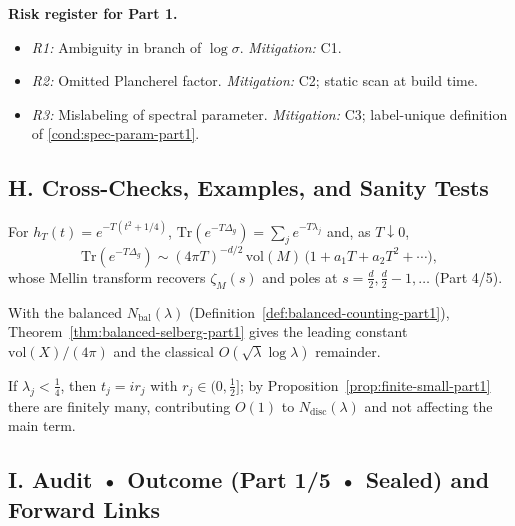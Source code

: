 \medskip

\noindent\textbf{Risk register for Part 1.}
\begin{itemize}
  \item \emph{R1:} Ambiguity in branch of $\log\sigma$. \emph{Mitigation:} C1.
  \item \emph{R2:} Omitted Plancherel factor. \emph{Mitigation:} C2; static scan at build time.
  \item \emph{R3:} Mislabeling of spectral parameter. \emph{Mitigation:} C3; label-unique definition of \eqref{cond:spec-param-part1}.
\end{itemize}


\subsection*{H. Cross-Checks, Examples, and Sanity Tests}
\label{subsec:crosscheck-examples-part1}

\begin{example}
For $h_T(t)=e^{-T(t^2+1/4)}$, $\mathrm{Tr}(e^{-T\Delta_g})=\sum_j e^{-T\lambda_j}$ and, as $T\downarrow0$,
\[
  \mathrm{Tr}(e^{-T\Delta_g})\sim (4\pi T)^{-d/2}\,\mathrm{vol}(M)\,\Big(1+a_1T+a_2T^2+\cdots\Big),
\]
whose Mellin transform recovers $\zeta_M(s)$ and poles at $s=\tfrac d2,\tfrac d2-1,\dots$ (Part 4/5).
\end{example}

\begin{example}
With the balanced $N_{\mathrm{bal}}(\lambda)$ (Definition~\ref{def:balanced-counting-part1}), Theorem~\ref{thm:balanced-selberg-part1} gives the leading constant $\mathrm{vol}(X)/(4\pi)$ and the classical $O(\sqrt{\lambda}\log\lambda)$ remainder.
\end{example}

\begin{example}
If $\lambda_j<\tfrac14$, then $t_j=ir_j$ with $r_j\in(0,\tfrac12]$; by Proposition~\ref{prop:finite-small-part1} there are finitely many, contributing $O(1)$ to $N_{\mathrm{disc}}(\lambda)$ and not affecting the main term.
\end{example}


\subsection*{I. Audit • Outcome (Part 1/5 • Sealed) and Forward Links}
\label{subsec:audit-outcome-part1}

